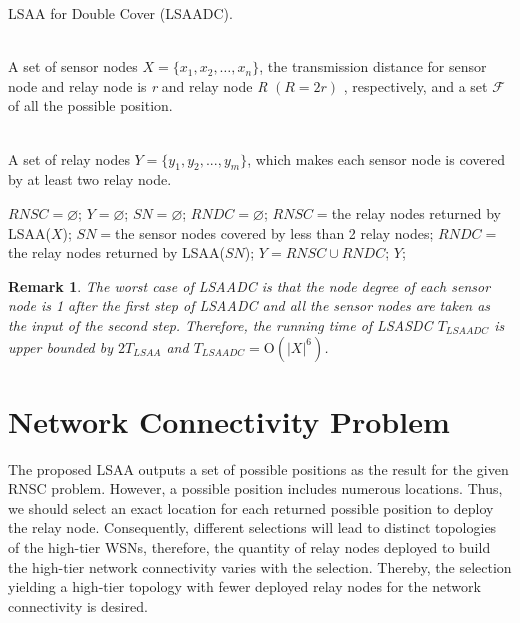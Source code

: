 \documentclass[journal]{IEEEtran}
\newtheorem{remark}{Remark}
\begin{document}
\begin{algorithm}[htb]         \caption{LSAA for Double Cover (LSAADC).}             
\label{LSAADC}                  
\begin{algorithmic}[1]                
\REQUIRE ~~\\                          A set of sensor nodes $X=\{x_1, x_2, \ldots, x_n\}$, the transmission distance for sensor node and relay node is \emph{r} and relay node \emph{R} $(R=2r)$ , respectively, and a set $\mathcal{F}$ of all the possible position.

\ENSURE ~~\\                           A set of relay nodes $Y=\{y_1, y_2, ... , y_m\}$, which makes each sensor node is covered by at least two relay node.

\STATE $RNSC=\varnothing$;
\STATE $Y=\varnothing$;
\STATE $SN=\varnothing$;
\STATE $RNDC=\varnothing$;
\STATE $RNSC=$the relay nodes returned by LSAA($X$);
\STATE $SN=$the sensor nodes covered by less than 2 relay nodes;
\STATE $RNDC=$the relay nodes returned by LSAA($SN$);
\STATE $Y=RNSC\cup RNDC$;
\RETURN $Y$;                
\end{algorithmic}

\end{algorithm}

\begin{remark} The worst case of LSAADC is that the node degree of each sensor node is 1 after the first step of LSAADC and all the sensor nodes are taken as the input of the second step. Therefore, the running time of LSASDC $T_{LSAADC}$ is upper bounded by $2T_{LSAA}$ and $T_{LSAADC}=\mathrm{O}({\left| X \right|}^6)$.
\end{remark}
\section{Network Connectivity Problem}
The proposed LSAA outputs a set of possible positions as the result for the given RNSC problem. However, a possible position includes numerous locations. Thus,
we should select an exact location for each returned possible position to deploy the relay node. Consequently, different selections will lead to distinct topologies of the high-tier WSNs, therefore, the quantity of relay nodes deployed to build the high-tier network connectivity varies with the selection. Thereby, the selection yielding a high-tier topology with fewer deployed relay nodes for the network connectivity is desired.
\end{document}
